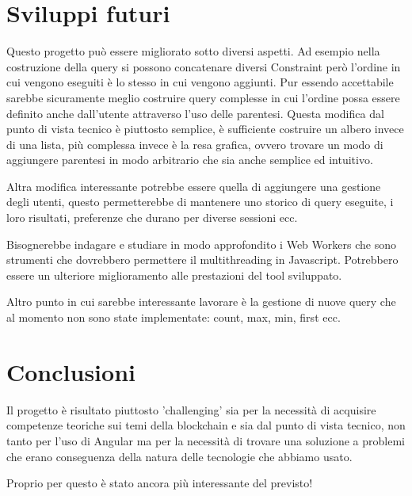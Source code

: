 \section{Sviluppi futuri}
Questo progetto può essere migliorato sotto diversi aspetti.
Ad esempio nella costruzione della query si possono concatenare diversi Constraint però l'ordine in cui vengono eseguiti è lo stesso in cui vengono aggiunti.
Pur essendo accettabile sarebbe sicuramente meglio costruire query complesse in cui l'ordine possa essere definito anche dall'utente attraverso l'uso delle parentesi.
Questa modifica dal punto di vista tecnico è piuttosto semplice, è sufficiente costruire un albero invece di una lista, più complessa invece è la resa grafica, ovvero trovare un modo di aggiungere parentesi in modo arbitrario che sia anche semplice ed intuitivo.

\vspace{0.5cm}

Altra modifica interessante potrebbe essere quella di aggiungere una gestione degli utenti, questo permetterebbe di mantenere uno storico di query eseguite, i loro risultati, preferenze che durano per diverse sessioni ecc.

\vspace{0.5cm}
Bisognerebbe indagare e studiare in modo approfondito i Web Workers che sono strumenti che dovrebbero permettere il multithreading in Javascript.
Potrebbero essere un ulteriore miglioramento alle prestazioni del tool sviluppato.

\vspace{0.5cm}
Altro punto in cui sarebbe interessante lavorare è la gestione di nuove query che al momento non sono state implementate:
count, max, min, first ecc.

\section{Conclusioni}
Il progetto è risultato piuttosto 'challenging' sia per la necessità di acquisire competenze teoriche sui temi della blockchain e sia dal punto di vista tecnico,
non tanto per l'uso di Angular ma per la necessità di trovare una soluzione a problemi che erano conseguenza della natura delle tecnologie che abbiamo usato.

\vspace{0.5cm}

Proprio per questo è stato ancora più interessante del previsto!